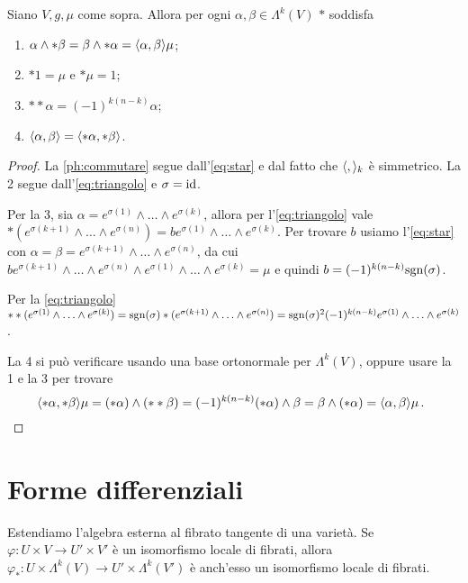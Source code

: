 \begin{proposition} \label{prop:ProprietaHodge}
	Siano $V,g,\mu$ come sopra. Allora per ogni $\alpha,\beta\in\Lambda^k(V)$ $*$ soddisfa
	\begin{enumerate}
		\item $\alpha\wedge *\beta = \beta \wedge * \alpha = \langle \alpha , \beta \rangle \mu$; \label{ph:commutare}
		\item $*1 = \mu$ e $*\mu=1$;
		\item $**\alpha = (-1)^{k(n-k)} \alpha$;
		\item $\langle \alpha , \beta \rangle = \langle *\alpha , *\beta \rangle$.
	\end{enumerate}
\end{proposition}
\begin{proof}
	La \ref{ph:commutare} segue dall'\cref{eq:star} e dal fatto che $\langle  ,  \rangle_k$ è simmetrico.
	La 2 segue dall'\cref{eq:triangolo} e $\sigma = \mathrm{id}$.
	
	Per la 3, sia $\alpha = e^{\sigma(1)}\wedge \ldots \wedge e^{\sigma(k)}$, allora per l'\cref{eq:triangolo} vale $*(e^{\sigma(k+1)} \wedge\ldots\wedge e^{\sigma(n)}) = b e^{\sigma(1)} \wedge\ldots\wedge e^{\sigma(k)}$. Per trovare $b$ usiamo l'\cref{eq:star} con $\alpha = \beta = e^{\sigma(k+1)} \wedge\ldots\wedge e^{\sigma(n)}$, da cui $b e^{\sigma(k+1)} \wedge\ldots\wedge e^{\sigma(n)} \wedge e^{\sigma(1)} \wedge\ldots\wedge e^{\sigma(k)} = \mu$ e quindi $b = (-1)^{k(n-k)}\mathrm{sgn}(\sigma)$.
	
	Per la \ref{eq:triangolo} $**(e^{\sigma(1)} \wedge\ldots\wedge e^{\sigma(k)}) = \mathrm{sgn}(\sigma) * (e^{\sigma(k+1)} \wedge\ldots\wedge e^{\sigma(n)}) = \mathrm{sgn}(\sigma)^2 (-1)^{k(n-k)} e^{\sigma(1)} \wedge\ldots\wedge e^{\sigma(k)}$.
	
	La 4 si può verificare usando una base ortonormale per $\Lambda^k(V)$, oppure usare la 1 e la 3 per trovare
	\begin{equation*}
		\langle *\alpha , *\beta \rangle \mu = (*\alpha) \wedge (**\beta) = (-1)^{k(n-k)} (*\alpha)\wedge\beta = \beta\wedge (*\alpha) = \langle \alpha , \beta \rangle \mu\, \text{. }
	\end{equation*}
\end{proof}


\section{Forme differenziali}

Estendiamo l'algebra esterna al fibrato tangente di una varietà.
Se $\varphi: U \times V \to U' \times V'$ è un isomorfismo locale di fibrati, allora $\varphi_* : U\times \Lambda^k(V) \to U' \times \Lambda^k(V')$ è anch'esso un isomorfismo locale di fibrati.

